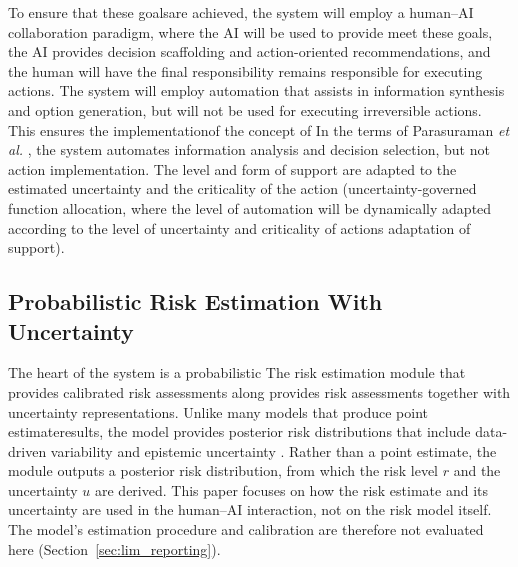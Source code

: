 \documentclass[journal]{IEEEtran}
\theoremstyle{plain}
\theoremstyle{definition}
\providecommand{\DIFaddtex}[1]{{\protect\color{blue} \sf #1}} %
\providecommand{\DIFdeltex}[1]{{\protect\color{red} \scriptsize #1}} %
\providecommand{\DIFaddbegin}{} %
\providecommand{\DIFaddend}{} %
\providecommand{\DIFdelbegin}{} %
\providecommand{\DIFdelend}{} %
\providecommand{\DIFadd}[1]{\texorpdfstring{\DIFaddtex{#1}}{#1}} %
\providecommand{\DIFdel}[1]{\texorpdfstring{\DIFdeltex{#1}}{}} %
\newcommand{\DIFscaledelfig}{0.5}
\newlength{\DIFdelgraphicswidth} %
\newlength{\DIFdelgraphicsheight} %
\newcommand{\DIFaddincludegraphics}[2][]{{\color{blue}\fbox{\DIFOincludegraphics[#1]{#2}}}} %
\newcommand{\DIFdelincludegraphics}[2][]{%
\sbox{\DIFdelgraphicsbox}{\DIFOincludegraphics[#1]{#2}}%
\settoboxwidth{\DIFdelgraphicswidth}{\DIFdelgraphicsbox} %
\settoboxtotalheight{\DIFdelgraphicsheight}{\DIFdelgraphicsbox} %
\scalebox{\DIFscaledelfig}{%
\parbox[b]{\DIFdelgraphicswidth}{\usebox{\DIFdelgraphicsbox}\\[-\baselineskip] \rule{\DIFdelgraphicswidth}{0em}}\llap{\resizebox{\DIFdelgraphicswidth}{\DIFdelgraphicsheight}{%
\setlength{\unitlength}{\DIFdelgraphicswidth}%
\begin{picture}(1,1)%
\thicklines\linethickness{2pt} %
{\color[rgb]{1,0,0}\put(0,0){\framebox(1,1){}}}%
{\color[rgb]{1,0,0}\put(0,0){\line( 1,1){1}}}%
{\color[rgb]{1,0,0}\put(0,1){\line(1,-1){1}}}%
\end{picture}%
}\hspace*{3pt}}} %
} %
\DeclareRobustCommand{\DIFaddbegin}{\DIFOaddbegin \let\includegraphics\DIFaddincludegraphics} %
\DeclareRobustCommand{\DIFaddend}{\DIFOaddend \let\includegraphics\DIFOincludegraphics} %
\DeclareRobustCommand{\DIFdelbegin}{\DIFOdelbegin \let\includegraphics\DIFdelincludegraphics} %
\DeclareRobustCommand{\DIFdelend}{\DIFOaddend \let\includegraphics\DIFOincludegraphics} %
\begin{document}
    To \DIFdelbegin \DIFdel{ensure that these goalsare achieved, the system will employ a human--AI collaboration paradigm, where the AI will be used to provide }\DIFdelend \DIFaddbegin \DIFadd{meet these goals, the AI provides }\DIFaddend decision scaffolding and action-oriented recommendations, and the human \DIFdelbegin \DIFdel{will have the final responsibility }\DIFdelend \DIFaddbegin \DIFadd{remains responsible }\DIFaddend for executing actions. \DIFdelbegin \DIFdel{The system will employ automation that assists in information synthesis and option generation, but will not be used for executing irreversible actions. This ensures the implementationof the concept of }\DIFdelend \DIFaddbegin \DIFadd{In the terms of Parasuraman \emph{et al.} \cite{Parasuraman2000LOA}, the system automates information analysis and decision selection, but not action implementation. The level and form of support are adapted to the estimated uncertainty and the criticality of the action (}\DIFaddend uncertainty-governed \DIFdelbegin \DIFdel{function allocation, where the level of automation will be dynamically adapted according to the level of uncertainty and criticality of actions}\DIFdelend \DIFaddbegin \DIFadd{adaptation of support)}\DIFaddend .

    \subsection{Probabilistic Risk Estimation With Uncertainty}
    \DIFdelbegin \DIFdel{The heart of the system is a probabilistic }\DIFdelend \DIFaddbegin \label{sec:risk}
    \DIFadd{The }\DIFaddend risk estimation module \DIFdelbegin \DIFdel{that provides calibrated risk assessments along }\DIFdelend \DIFaddbegin \DIFadd{provides risk assessments together }\DIFaddend with uncertainty representations. \DIFdelbegin \DIFdel{Unlike many models that produce point estimateresults, the model provides posterior risk distributions that include data-driven variability and epistemic uncertainty .
}\DIFdelend \DIFaddbegin \DIFadd{Rather than a point estimate, the module outputs a posterior risk distribution, from which the risk level $r$ and the uncertainty $u$ are derived.
    This paper focuses on how the risk estimate and its uncertainty are used in the human--AI interaction, not on the risk model itself. The model's estimation procedure and calibration are therefore not evaluated here (Section~\ref{sec:lim_reporting}).
}\DIFaddend 
\end{document}
